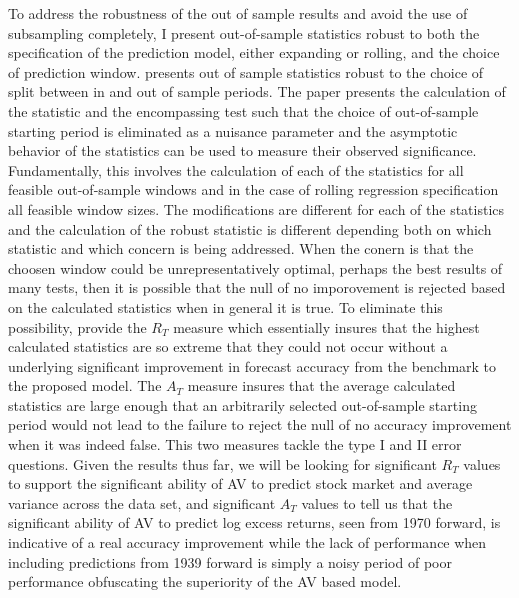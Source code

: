 To address the robustness of the out of sample results and avoid the use of subsampling completely, I present out-of-sample statistics robust to both the specification of the prediction model, either expanding or rolling, and the choice of prediction window. \cite{rossi_out--sample_2012} presents out of sample statistics robust to the choice of split between in and out of sample periods. The paper presents the calculation of the \citet{Diebold1995} statistic and the \citet{harvey_tests_1998} encompassing test such that the choice of out-of-sample starting period is eliminated as a nuisance parameter and the asymptotic behavior of the statistics can be used to measure their observed significance. Fundamentally, this involves the calculation of each of the statistics for all feasible out-of-sample windows and in the case of rolling regression specification all feasible window sizes. The modifications are different for each of the statistics and the calculation of the robust statistic is different depending both on which statistic and which concern is being addressed. When the conern is that the choosen window could be unrepresentatively optimal, perhaps the best results of many tests, then it is possible that the null of no imporovement is rejected based on the calculated statistics when in general it is true. To eliminate this possibility, \citet{rossi_out--sample_2012} provide the $R_{T}$ measure which essentially insures that the highest calculated statistics are so extreme that they could not occur without a underlying significant improvement in forecast accuracy from the benchmark to the proposed model. The $A_{T}$ measure insures that the average calculated statistics are large enough that an arbitrarily selected out-of-sample starting period would not lead to the failure to reject the null of no accuracy improvement when it was indeed false. This two measures tackle the type I and II error questions. Given the results thus far, we will be looking for significant $R_{T}$ values to support the significant ability of AV to predict stock market and average variance across the data set, and significant $A_{T}$ values to tell us that the significant ability of AV to predict log excess returns, seen from 1970 forward, is indicative of a real accuracy improvement while the lack of performance when including predictions from 1939 forward is simply a noisy period of poor performance obfuscating the superiority of the AV based model.

